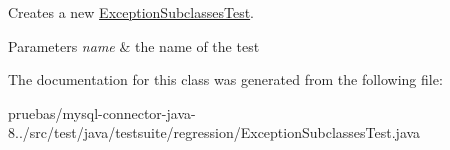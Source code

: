 Creates a new \mbox{\hyperlink{classtestsuite_1_1regression_1_1_exception_subclasses_test}{Exception\+Subclasses\+Test}}.


\begin{DoxyParams}{Parameters}
{\em name} & the name of the test \\
\hline
\end{DoxyParams}


The documentation for this class was generated from the following file\+:\begin{DoxyCompactItemize}
\item 
pruebas/mysql-\/connector-\/java-\/8../src/test/java/testsuite/regression/Exception\+Subclasses\+Test.\+java\end{DoxyCompactItemize}
